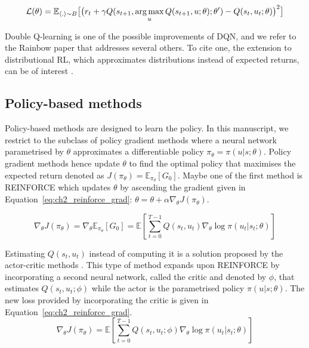 \begin{equation}
    \label{eq:ch2_doubleQ}
    \mathcal{L}(\theta) = \mathbb{E}_{\langle . \rangle\sim B} \big[\big(r_{t} + \gamma Q(s_{t+1}, \operatorname*{arg\,max}_u Q(s_{t+1}, u;\theta) ; \theta')- Q(s_{t}, u_{t}; \theta)\big)^{2}\big]
\end{equation}

Double Q-learning is one of the possible improvements of DQN, and we refer to the Rainbow paper \citep{hessel2018rainbow} that addresses several others.
To cite one, the extension to distributional RL, which approximates distributions instead of expected returns, can be of interest \citep{bellemare2017distributional, THEATE2023199}. 

\subsection{Policy-based methods} \label{sec:ch2_policy_based_methods}
Policy-based methods are designed to learn the policy.
In this manuscript, we restrict to the subclass of policy gradient methods where a neural network parametrised by $\theta$ approximates a differentiable policy $\pi_\theta=\pi(u|s;\theta)$.
Policy gradient methods hence update $\theta$ to find the optimal policy that maximises the expected return denoted as  $J(\pi_\theta) = \mathbb{E}_{\pi_\theta}[G_0]$.
Maybe one of the first method is REINFORCE \citep{williams1992simple} which updates $\theta$  by ascending the gradient given in Equation~\ref{eq:ch2_reinforce_grad}: $\theta = \theta + \alpha \nabla_\theta J(\pi_\theta)$.

\begin{equation}
\label{eq:ch2_reinforce_grad}
    \nabla_\theta J(\pi_\theta) = \nabla_\theta \mathbb{E}_{\pi_\theta}[G_0] = \mathbb{E}\left[\sum_{t=0}^{T-1} Q(s_t, u_t) \nabla_\theta \log \pi(u_t|s_t;\theta)\right]
\end{equation}

Estimating $Q(s_t, u_t)$ instead of computing it is a solution proposed by the actor-critic methods \citep{sutton1999policy,konda1999actor}.
This type of method expands upon REINFORCE by incorporating a second neural network, called the critic and denoted by $\phi$, that estimates $Q(s_t, u_t;\phi)$ while the actor is the parametrised policy $\pi(u|s;\theta)$.
The new loss provided by incorporating the critic is given in Equation~\ref{eq:ch2_reinforce_grad}.
\begin{equation}
\label{eq:ch2_Q_actor_crit}
    \nabla_\theta J(\pi_\theta) = \mathbb{E}\left[\sum_{t=0}^{T-1} Q(s_t, u_t;\phi) \nabla_\theta \log \pi(u_t|s_t;\theta)\right]
\end{equation}

